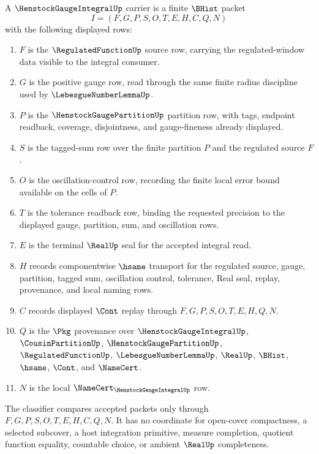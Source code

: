 \begin{definition}
\label{def:henstock-gauge-integral-carrier}
A $\HenstockGaugeIntegralUp$ carrier is a finite $\BHist$ packet
$$
I=(F,G,P,S,O,T,E,H,C,Q,N)
$$
with the following displayed rows:
\begin{enumerate}
\item $F$ is the $\RegulatedFunctionUp$ source row, carrying the regulated-window data visible to the integral consumer.
\item $G$ is the positive gauge row, read through the same finite radius discipline used by $\LebesgueNumberLemmaUp$.
\item $P$ is the $\HenstockGaugePartitionUp$ partition row, with tags, endpoint readback, coverage, disjointness, and gauge-fineness already displayed.
\item $S$ is the tagged-sum row over the finite partition $P$ and the regulated source $F$.
\item $O$ is the oscillation-control row, recording the finite local error bound available on the cells of $P$.
\item $T$ is the tolerance readback row, binding the requested precision to the displayed gauge, partition, sum, and oscillation rows.
\item $E$ is the terminal $\RealUp$ seal for the accepted integral read.
\item $H$ records componentwise $\hsame$ transport for the regulated source, gauge, partition, tagged sum, oscillation control, tolerance, Real seal, replay, provenance, and local naming rows.
\item $C$ records displayed $\Cont$ replay through $F,G,P,S,O,T,E,H,Q,N$.
\item $Q$ is the $\Pkg$ provenance over $\HenstockGaugeIntegralUp$, $\CousinPartitionUp$, $\HenstockGaugePartitionUp$, $\RegulatedFunctionUp$, $\LebesgueNumberLemmaUp$, $\RealUp$, $\BHist$, $\hsame$, $\Cont$, and $\NameCert$.
\item $N$ is the local $\NameCert_{\HenstockGaugeIntegralUp}$ row.
\end{enumerate}
The classifier compares accepted packets only through $F,G,P,S,O,T,E,H,C,Q,N$. It has no coordinate for open-cover compactness, a selected subcover, a host integration primitive, measure completion, quotient function equality, countable choice, or ambient $\RealUp$ completeness.
\end{definition}

